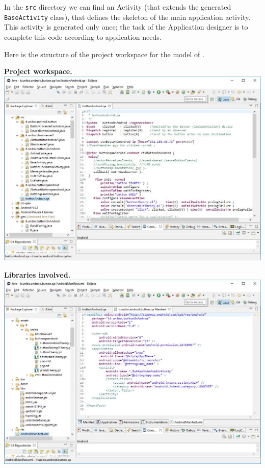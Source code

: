 In the  \texttt{src} directory we can find an Activity (that extends the generated \texttt{BaseActivity} class), that defines the skeleton of the main application activity. This activity is generated only once; the task of the Application designer is to complete this code according to application needs.

Here is the structure of the project workspace for the model of .

\textbf{Project workspace.}\\
\includegraphics[scale = 0.40]{./img/qainitAndroid4.jpg}
 

\textbf{Libraries involved.} \\
 \includegraphics[scale = 0.40]{./img/qainitAndroid5.jpg}
 

\newpage 
